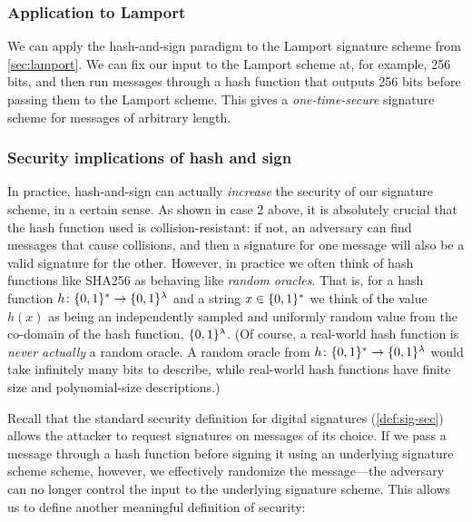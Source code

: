 \subsubsection{Application to Lamport}
We can apply the hash-and-sign paradigm to the Lamport signature scheme from \cref{sec:lamport}.
We can fix our input to the Lamport scheme at, for example, 256 bits, and then run messages through a hash function that outputs 256 bits before passing them to the Lamport scheme.
This gives a \emph{one-time-secure} signature scheme for messages of arbitrary length.

\subsubsection{Security implications of hash and sign}

In practice, hash-and-sign can actually \emph{increase} the security of our signature scheme, in a certain sense. As shown in case 2 above, it is absolutely crucial that the hash function used is collision-resistant: if not, an adversary can find messages that cause collisions, and then a signature for one message will also be a valid signature for the other. However, in practice we often think of hash functions like SHA256 as behaving like \emph{random oracles}.
That is, for a hash function $h \colon \{0,1\}^* \to \{0,1\}^\lambda$ and a string $x \in \{0,1\}^*$ we think of the value $h(x)$ as being an independently
sampled and uniformly random value from the co-domain of the hash function, $\{0,1\}^\lambda$.
(Of course, a real-world hash function is \emph{never actually} a random
oracle. A random oracle from $h \colon \{0,1\}^* \to \{0,1\}^\lambda$ would take
infinitely many bits to describe, while real-world hash functions have
finite size and polynomial-size descriptions.)

Recall that the standard security definition for
digital signatures (\cref{def:sig-sec}) allows
the attacker to request signatures on messages
of its choice.
If we pass a message through a hash function before signing
it using an underlying signature scheme scheme, however, 
we effectively randomize the message---the adversary can no longer control the
input to the underlying signature scheme. This allows us to define
another meaningful definition of security:

